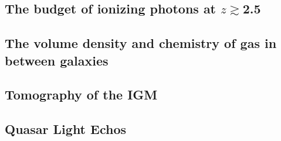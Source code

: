 \noindent{}

\subsection{The budget of ionizing photons at $z$$\gtrsim$2.5}

\noindent{}

\subsection{The volume density and chemistry of gas in between galaxies}

\noindent{}

\subsection{Tomography of the IGM}

\noindent{}

\subsection{Quasar Light Echos} 

\citep{2018arXiv181005156S}



%
%
%
%

